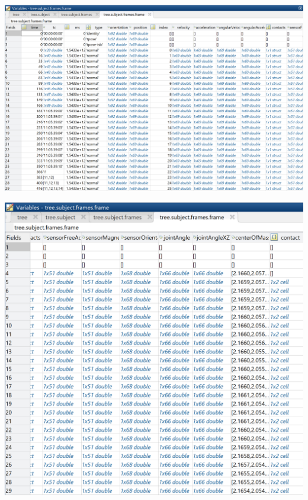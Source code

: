 \documentclass[12pt,twoside]{report}
\begin{document}
\begin{center}
\includegraphics[scale=0.25]{project_figures/fig8_1}
\end{center}
\begin{center}
\includegraphics[scale=0.25]{project_figures/fig8_2}
\end{center}
\end{document}
